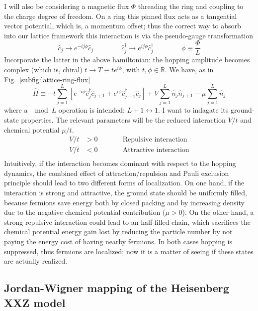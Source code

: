 I will also be considering a magnetic flux $\Phi$ threading the ring and coupling to the charge degree of freedom. On a ring this pinned flux acts as a tangential vector potential, which is, a momentum offset; thus the correct way to absorb into our lattice framework this interaction is via the pseudo-gauge transformation
\[
	\hat c_j \to e^{-ij \phi} \hat c_j
	\qquad\qquad
	\hat c_j^\dagger \to e^{ij \phi} \hat c_j^\dagger
	\qquad\qquad
	\phi \equiv \frac{\Phi}{L}
\]
Incorporate the latter in the above hamiltonian: the hopping amplitude becomes complex (which is, chiral) $t \to T \equiv t e^{i\phi}$, with $t, \phi \in \mathbb{R}$. We have, as in Fig.~\ref{subfig:lattice-ring-flux}
\begin{equation}\label{eq:spinless-hamiltonian-tbc}
	\hat H \equiv -t \sum_{j=1}^L \left[ 
		e^{-i\phi} \hat c_j^\dagger \hat c_{j+1} + e^{i\phi} \hat c_{j+1}^\dagger \hat c_j 
	\right] + V \sum_{j=1}^L \hat n_j \hat n_{j+1} - \mu \sum_{j=1}^L \hat n_j
\end{equation}
where a $\mod L$ operation is intended: $L+1 \leftrightarrow 1$. I want to indagate its ground-state properties. The relevant parameters will be the reduced interaction $V/t$ and chemical potential $\mu/t$.
\[
	\begin{aligned}
		V/t &> 0 \qquad
		&&\text{Repulsive interaction} \\
		V/t &< 0 \qquad
		&&\text{Attractive interaction} \\
	\end{aligned}
\]
Intuitively, if the interaction becomes dominant with respect to the hopping dynamics, the combined effect of attraction/repulsion and Pauli exclusion principle should lead to two different forms of localization. On one hand, if the interaction is strong and attractive, the ground state should be uniformly filled, because fermions save energy both by closed packing and by increasing density due to the negative chemical potential contribution ($\mu > 0$). On the other hand, a strong repulsive interaction could lead to an half-filled chain, which sacrifices the chemical potential energy gain lost by reducing the particle number by not paying the energy cost of having nearby fermions. In both cases hopping is suppressed, thus fermions are localized; now it is a matter of seeing if these states are actually realized.

\subsection{Jordan-Wigner mapping of the Heisenberg XXZ model}


